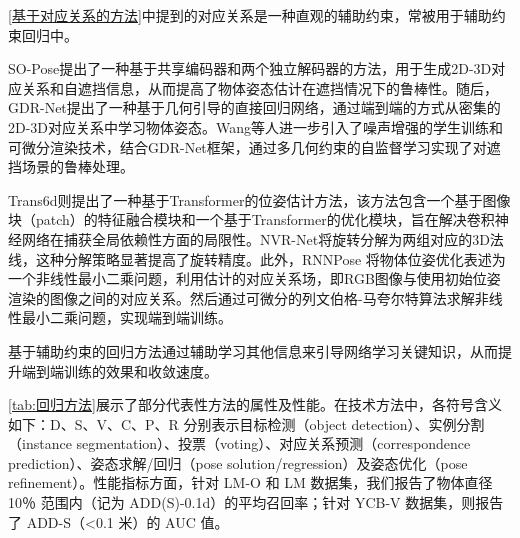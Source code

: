 \par \autoref{基于对应关系的方法}中提到的对应关系是一种直观的辅助约束，常被用于辅助约束回归中。

\par SO-Pose\cite{di2021so}提出了一种基于共享编码器和两个独立解码器的方法，用于生成2D-3D对应关系和自遮挡信息，从而提高了物体姿态估计在遮挡情况下的鲁棒性。随后，GDR-Net\cite{wang2021gdr}提出了一种基于几何引导的直接回归网络，通过端到端的方式从密集的2D-3D对应关系中学习物体姿态。Wang等人\cite{wang2021occlusion}进一步引入了噪声增强的学生训练和可微分渲染技术，结合GDR-Net框架\cite{wang2021gdr}，通过多几何约束的自监督学习实现了对遮挡场景的鲁棒处理。

\par Trans6d\cite{zhang2022trans6d}则提出了一种基于Transformer的位姿估计方法，该方法包含一个基于图像块（patch）的特征融合模块和一个基于Transformer的优化模块，旨在解决卷积神经网络在捕获全局依赖性方面的局限性。NVR-Net\cite{feng2023nvr}将旋转分解为两组对应的3D法线，这种分解策略显著提高了旋转精度。此外，RNNPose\cite{Xu2024RNNPose} 将物体位姿优化表述为一个非线性最小二乘问题，利用估计的对应关系场，即RGB图像与使用初始位姿渲染的图像之间的对应关系。然后通过可微分的列文伯格-马夸尔特算法\cite{Levenberg_Marquardt}求解非线性最小二乘问题，实现端到端训练。

\par 基于辅助约束的回归方法通过辅助学习其他信息来引导网络学习关键知识，从而提升端到端训练的效果和收敛速度。

\autoref{tab:回归方法}展示了部分代表性方法的属性及性能。在技术方法中，各符号含义如下：D、S、V、C、P、R 分别表示目标检测（object detection）、实例分割（instance segmentation）、投票（voting）、对应关系预测（correspondence prediction）、姿态求解/回归（pose solution/regression）及姿态优化（pose refinement）。性能指标方面，针对 LM-O 和 LM 数据集，我们报告了物体直径 10％ 范围内（记为 ADD(S)-0.1d）的平均召回率；针对 YCB-V 数据集，则报告了 ADD-S（<0.1 米）的 AUC 值。


